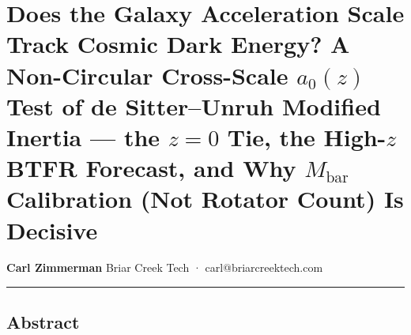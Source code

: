 \documentclass[
]{article}
\author{}
\date{}
\begin{document}
\section{\texorpdfstring{Does the Galaxy Acceleration Scale Track Cosmic
Dark Energy? A Non-Circular Cross-Scale \(a_0(z)\) Test of de
Sitter--Unruh Modified Inertia --- the \(z=0\) Tie, the High-\(z\) BTFR
Forecast, and Why \(M_\mathrm{bar}\) Calibration (Not Rotator Count) Is
Decisive}{Does the Galaxy Acceleration Scale Track Cosmic Dark Energy? A Non-Circular Cross-Scale a\_0(z) Test of de Sitter--Unruh Modified Inertia --- the z=0 Tie, the High-z BTFR Forecast, and Why M\_\{\textbackslash rm bar\} Calibration (Not Rotator Count) Is Decisive}}\label{does-the-galaxy-acceleration-scale-track-cosmic-dark-energy-a-non-circular-cross-scale-a_0z-test-of-de-sitterunruh-modified-inertia-the-z0-tie-the-high-z-btfr-forecast-and-why-m_rm-bar-calibration-not-rotator-count-is-decisive}

\textbf{Carl Zimmerman} Briar Creek Tech · carl@briarcreektech.com

\begin{center}\rule{0.5\linewidth}{0.5pt}\end{center}

\subsection{Abstract}\label{abstract}
\end{document}
